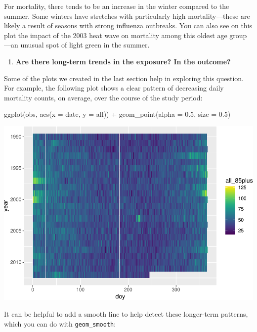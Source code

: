 \documentclass[
]{book}
\newenvironment{Shaded}{\begin{snugshade}}{\end{snugshade}}
\newcommand{\AttributeTok}[1]{\textcolor[rgb]{0.77,0.63,0.00}{#1}}
\newcommand{\FloatTok}[1]{\textcolor[rgb]{0.00,0.00,0.81}{#1}}
\newcommand{\FunctionTok}[1]{\textcolor[rgb]{0.00,0.00,0.00}{#1}}
\newcommand{\NormalTok}[1]{#1}
\newcommand{\SpecialCharTok}[1]{\textcolor[rgb]{0.00,0.00,0.00}{#1}}
\providecommand{\tightlist}{%
  \setlength{\itemsep}{0pt}\setlength{\parskip}{0pt}}
\begin{document}
For mortality, there tends to be an increase in the winter compared to the summer.
Some winters have stretches with particularly high mortality---these are likely
a result of seasons with strong influenza outbreaks. You can also see on this
plot the impact of the 2003 heat wave on mortality among this oldest age group---an
unusual spot of light green in the summer.

\begin{enumerate}
\def\labelenumi{\arabic{enumi}.}
\setcounter{enumi}{3}
\tightlist
\item
  \textbf{Are there long-term trends in the exposure? In the outcome?}
\end{enumerate}

Some of the plots we created in the last section help in exploring this
question. For example, the following plot shows a clear pattern of decreasing
daily mortality counts, on average, over the course of the study period:

\begin{Shaded}
\begin{Highlighting}[]
\FunctionTok{ggplot}\NormalTok{(obs, }\FunctionTok{aes}\NormalTok{(}\AttributeTok{x =}\NormalTok{ date, }\AttributeTok{y =}\NormalTok{ all)) }\SpecialCharTok{+} 
  \FunctionTok{geom\_point}\NormalTok{(}\AttributeTok{alpha =} \FloatTok{0.5}\NormalTok{, }\AttributeTok{size =} \FloatTok{0.5}\NormalTok{)}
\end{Highlighting}
\end{Shaded}

\includegraphics{adv_epi_analysis_files/figure-latex/unnamed-chunk-13-1.pdf}

It can be helpful to add a smooth line to help detect these longer-term
patterns, which you can do with \texttt{geom\_smooth}:
\end{document}
